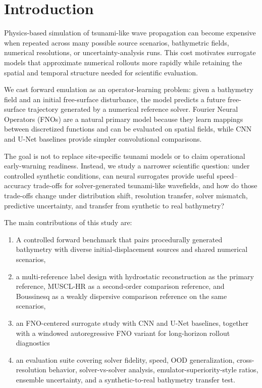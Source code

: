 \section{Introduction}
\setlength{\parskip}{1em}

Physics-based simulation of tsunami-like wave propagation can become expensive when repeated across many possible source scenarios, bathymetric fields, numerical resolutions, or uncertainty-analysis runs. This cost motivates surrogate models that approximate numerical rollouts more rapidly while retaining the spatial and temporal structure needed for scientific evaluation.

We cast forward emulation as an operator-learning problem: given a bathymetry field and an initial free-surface disturbance, the model predicts a future free-surface trajectory generated by a numerical reference solver. Fourier Neural Operators (FNOs) are a natural primary model because they learn mappings between discretized functions and can be evaluated on spatial fields, while CNN and U-Net baselines provide simpler convolutional comparisons.

The goal is not to replace site-specific tsunami models or to claim operational early-warning readiness. Instead, we study a narrower scientific question: under controlled synthetic conditions, can neural surrogates provide useful speed--accuracy trade-offs for solver-generated tsunami-like wavefields, and how do those trade-offs change under distribution shift, resolution transfer, solver mismatch, predictive uncertainty, and transfer from synthetic to real bathymetry?

\noindent
The main contributions of this study are:

\begin{enumerate}[leftmargin=3.6em]
    \item A controlled forward benchmark that pairs procedurally generated bathymetry with diverse initial-displacement sources and shared numerical scenarios,
    \item a multi-reference label design with hydrostatic reconstruction as the primary reference, MUSCL-HR as a second-order comparison reference, and Boussinesq as a weakly dispersive comparison reference on the same scenarios,
    \item an FNO-centered surrogate study with CNN and U-Net baselines, together with a windowed autoregressive FNO variant for long-horizon rollout diagnostics
    \item an evaluation suite covering solver fidelity, speed, OOD generalization, cross-resolution behavior, solver-vs-solver analysis, emulator-superiority-style ratios, ensemble uncertainty, and a synthetic-to-real bathymetry transfer test.
\end{enumerate}
